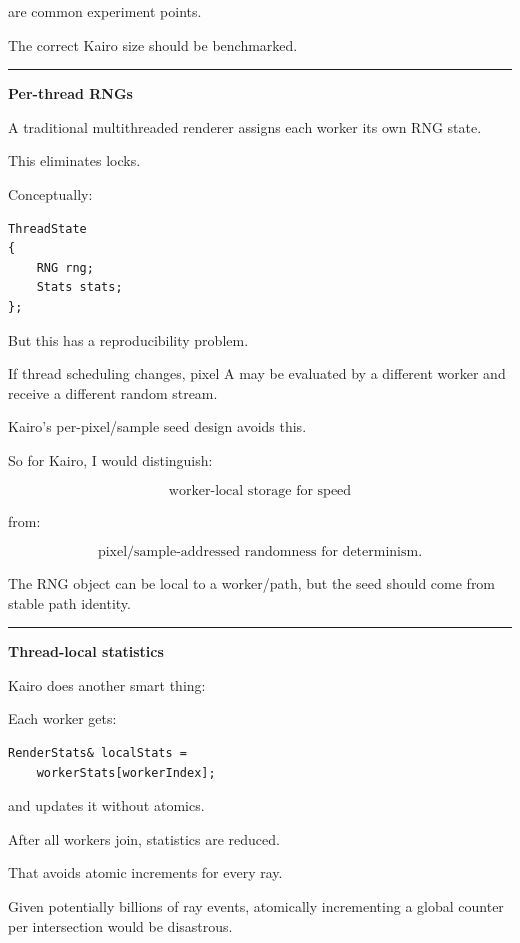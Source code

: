 are common experiment points.

The correct Kairo size should be benchmarked.

\begin{center}\rule{0.5\linewidth}{0.5pt}\end{center}

\textbf{Per-thread RNGs}

A traditional multithreaded renderer assigns each worker its own RNG state.

This eliminates locks.

Conceptually:

\begin{verbatim}
ThreadState
{
    RNG rng;
    Stats stats;
};
\end{verbatim}

But this has a reproducibility problem.

If thread scheduling changes, pixel A may be evaluated by a different worker and receive a different random stream.

Kairo's per-pixel/sample seed design avoids this.

So for Kairo, I would distinguish:

\[
\boxed{
\text{worker-local storage for speed}
}
\]

from:

\[
\boxed{
\text{pixel/sample-addressed randomness for determinism}.
}
\]

The RNG object can be local to a worker/path, but the seed should come from stable path identity.

\begin{center}\rule{0.5\linewidth}{0.5pt}\end{center}

\textbf{Thread-local statistics}

Kairo does another smart thing:

Each worker gets:

\begin{verbatim}
RenderStats& localStats =
    workerStats[workerIndex];
\end{verbatim}

and updates it without atomics.

After all workers join, statistics are reduced.

That avoids atomic increments for every ray.

Given potentially billions of ray events, atomically incrementing a global counter per intersection would be disastrous.

